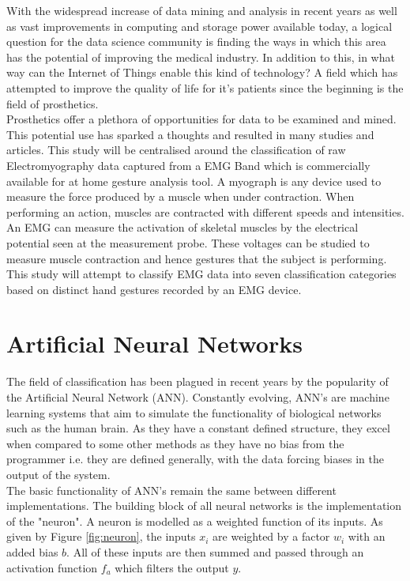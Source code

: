 \documentclass[11pt]{article}
\begin{document}
	\noindent	
	With the widespread increase of data mining and analysis in recent years as well as vast improvements in computing and storage power available today, a logical question for the data science community is finding the ways in which this area has the potential of improving the medical industry. In addition to this, in what way can the Internet of Things enable this kind of technology? A field which has attempted to improve the quality of life for it's patients since the beginning is the field of prosthetics.\\
	
	\noindent
	Prosthetics offer a plethora of opportunities for data to be examined and mined. This potential use has sparked a thoughts and resulted in many studies and articles. This study will be centralised around the classification of raw Electromyography data captured from a EMG Band which is commercially available for at home gesture analysis tool. A myograph is any device used to measure the force produced by a muscle when under contraction. When performing an action, muscles are contracted with different speeds and intensities. An EMG can measure the activation of skeletal muscles by the electrical potential seen at the measurement probe. These voltages can be studied to measure muscle contraction and hence gestures that the subject is performing. This study will attempt to classify EMG data into seven classification categories based on distinct hand gestures recorded by an EMG device.
	
	\section{Artificial Neural Networks}
	The field of classification has been plagued in recent years by the popularity of the Artificial Neural Network (ANN). Constantly evolving, ANN's are machine learning systems that aim to simulate the functionality of biological networks such as the human brain. As they have a constant defined structure, they excel when compared to some other methods as they have no bias from the programmer i.e. they are defined generally, with the data forcing biases in the output of the system.\\
	
	\noindent
	The basic functionality of ANN's remain the same between different implementations. The building block of all neural networks is the implementation of the "neuron". A neuron is modelled as a weighted function of its inputs. As given by Figure \ref{fig:neuron}, the inputs $x_i$ are weighted by a factor $w_i$ with an added bias $b$. All of these inputs are then summed and passed through an activation function $f_a$ which filters the output $y$.\\
	
\end{document}
